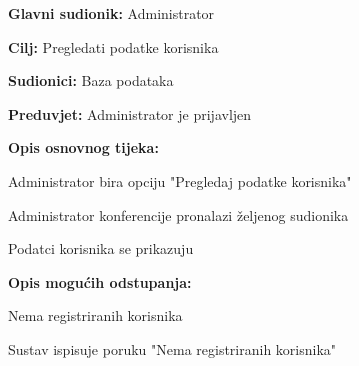 	\noindent {}
	\begin{packed_item}
		
		\item \textbf{Glavni sudionik: }Administrator
		\item  \textbf{Cilj:} Pregledati podatke korisnika
		\item  \textbf{Sudionici:} Baza podataka
		\item  \textbf{Preduvjet:} Administrator je prijavljen
		\item  \textbf{Opis osnovnog tijeka:}
		
		\item[] \begin{packed_enum}
			
			\item Administrator bira opciju "Pregledaj podatke korisnika"
			\item Administrator konferencije pronalazi željenog sudionika
			\item Podatci korisnika se prikazuju
			
		\end{packed_enum}
		
		\item  \textbf{Opis mogućih odstupanja:}
		
		\item[] \begin{packed_item}
			
			\item[2.a] Nema registriranih korisnika
			\item[] \begin{packed_enum}
				
				\item Sustav ispisuje poruku "Nema registriranih korisnika"
				
			\end{packed_enum}
		\end{packed_item}
	\end{packed_item}

